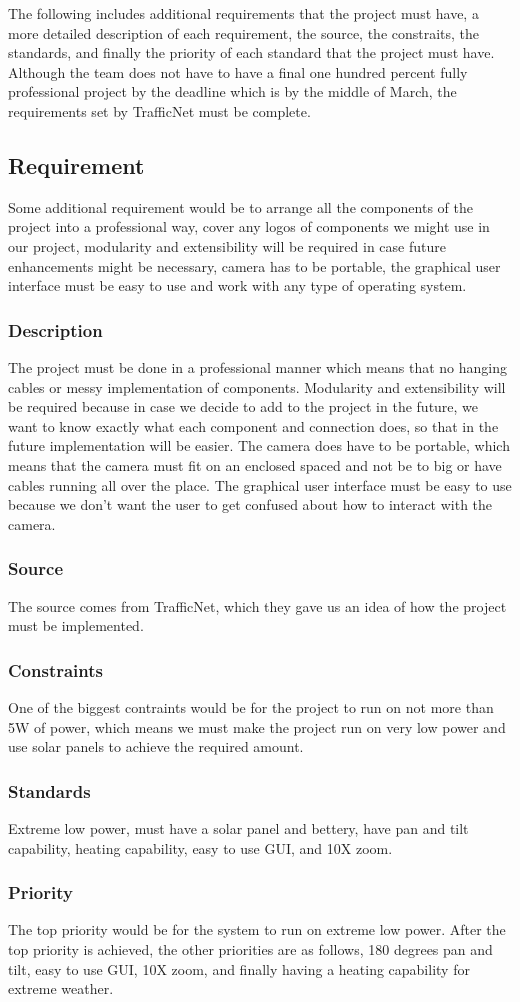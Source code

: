 The following includes additional requirements that the project must have, a more detailed description of each requirement, the source, the constraits, the standards, and finally the priority of each standard that the project must have. Although the team does not have to have a final one hundred percent fully professional project by the deadline which is by the middle of March, the requirements set by TrafficNet must be complete.

\subsection{Requirement}
Some additional requirement would be to arrange all the components of the project into a professional way, cover any logos of components we might use in our project, modularity and extensibility will be required in case future enhancements might be necessary, camera has to be portable, the graphical user interface must be easy to use and work with any type of operating system.
\subsubsection{Description}
The project must be done in a professional manner which means that no hanging cables or messy implementation of components. Modularity and extensibility will be required because in case we decide to add to the project in the future, we want to know exactly what each component and connection does, so that in the future implementation will be easier. The camera does have to be portable, which means that the camera must fit on an enclosed spaced and not be to big or have cables running all over the place. The graphical user interface must be easy to use because we don't want the user to get confused about how to interact with the camera.
\subsubsection{Source}
The source comes from TrafficNet, which they gave us an idea of how the project must be implemented.
\subsubsection{Constraints}
One of the biggest contraints would be for the project to run on not more than 5W of power, which means we must make the project run on very low power and use solar panels to achieve the required amount.
\subsubsection{Standards}
Extreme low power, must have a solar panel and bettery, have pan and tilt capability, heating capability,  easy to use GUI, and 10X zoom.
\subsubsection{Priority}
The top priority would be for the system to run on extreme low power. After the top priority is achieved, the other priorities are as follows, 180 degrees pan and tilt, easy to use GUI, 10X zoom, and finally having a heating capability for extreme weather. 
